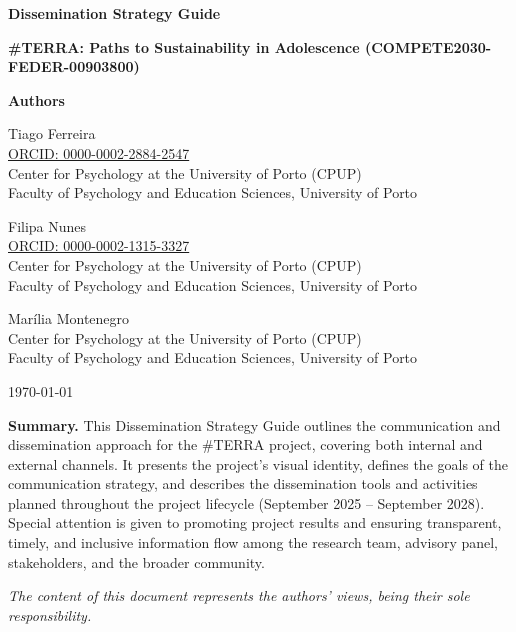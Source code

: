 
\vspace*{2.5cm}

\begin{center}
  {\LARGE \textbf{Dissemination Strategy Guide}\par}
  \vspace{1.0cm}
  {\large \textbf{\#TERRA: Paths to Sustainability in Adolescence (COMPETE2030-FEDER-00903800)}\par}
  \vspace{1.5cm}
\end{center}

\begin{center}
\textbf{Authors}

\vspace{0.5cm}

Tiago Ferreira\\
\href{https://orcid.org/0000-0002-2884-2547}{ORCID: 0000-0002-2884-2547}\\
Center for Psychology at the University of Porto (CPUP)\\
Faculty of Psychology and Education Sciences, University of Porto

\vspace{0.6cm}

Filipa Nunes\\
\href{https://orcid.org/0000-0002-1315-3327}{ORCID: 0000-0002-1315-3327}\\
Center for Psychology at the University of Porto (CPUP)\\
Faculty of Psychology and Education Sciences, University of Porto

\vspace{0.6cm}

Mar\'{i}lia Montenegro\\
Center for Psychology at the University of Porto (CPUP)\\
Faculty of Psychology and Education Sciences, University of Porto

\vspace{1.2cm}

{\large \today}
\end{center}

\vspace{1.5cm}

\noindent
\textbf{Summary.} This Dissemination Strategy Guide outlines the communication and dissemination approach for the \#TERRA project, covering both internal and external channels. It presents the project's visual identity, defines the goals of the communication strategy, and describes the dissemination tools and activities planned throughout the project lifecycle (September 2025 -- September 2028). Special attention is given to promoting project results and ensuring transparent, timely, and inclusive information flow among the research team, advisory panel, stakeholders, and the broader community.

\vspace{0.5cm}

\noindent\textit{The content of this document represents the authors' views, being their sole responsibility.}

\vfill
